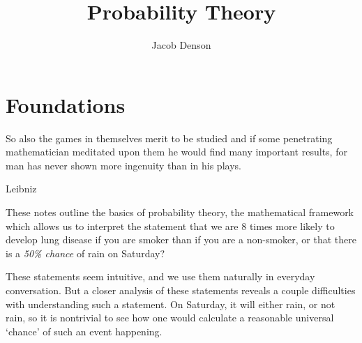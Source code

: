 

\title{Probability Theory}
\author{Jacob Denson}



\maketitle
\tableofcontents
{}

\setlength{}

\chapter{Foundations}


\epigraph{So also the games in themselves merit to be studied and if some penetrating mathematician meditated upon them he would find many important results, for man has never shown more ingenuity than in his plays.}{Leibniz}

These notes outline the basics of probability theory, the mathematical framework which allows us to interpret the statement that we are 8 times more likely to develop lung disease if you are smoker than if you are a non-smoker, or that there is a {\it 50\% chance} of rain on Saturday?

These statements seem intuitive, and we use them naturally in everyday conversation. But a closer analysis of these statements reveals a couple difficulties with understanding such a statement. On Saturday, it will either rain, or not rain, so it is nontrivial to see how one would calculate a reasonable universal `chance' of such an event happening.


